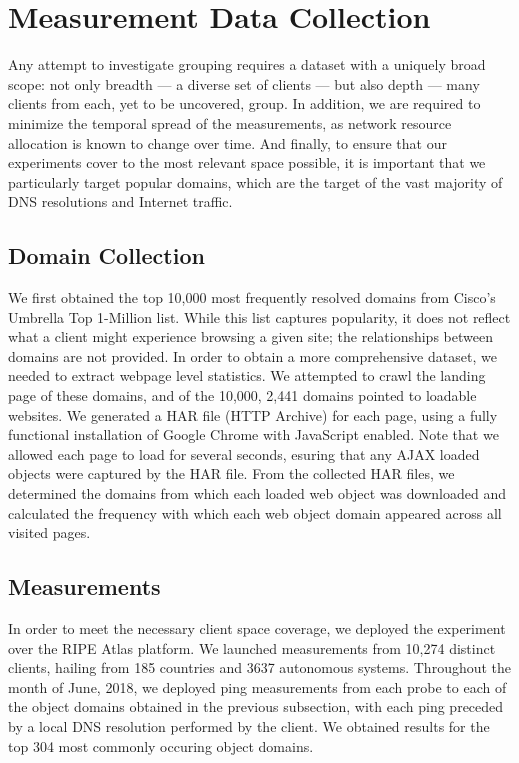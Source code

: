 \section{Measurement Data Collection} \label{sky:data}

Any attempt to investigate grouping requires a dataset with a
uniquely broad scope: not only breadth --- a diverse set of clients --- but also depth --- many
clients from each, yet to be uncovered, group. In addition, we are required to minimize the
temporal spread of the measurements, as network resource allocation is known to change over time.
And finally, to ensure that our experiments cover to the most relevant space possible, it is
important that we particularly target popular domains, which are the target of the vast majority
of DNS resolutions and Internet traffic.

\subsection{Domain Collection}

We first obtained the top 10,000 most frequently resolved domains from Cisco's Umbrella Top
1-Million list. While this list captures popularity, it does not reflect what a client might
experience browsing a given site; the relationships between domains are not provided. In order to
obtain a more comprehensive dataset, we needed to extract webpage level statistics. We attempted to
crawl the landing page of these domains, and of the 10,000, 2,441 domains pointed to loadable
websites. We generated a HAR file (HTTP Archive) for each page, using a fully functional
installation of Google Chrome with JavaScript enabled. Note that we allowed each page to load for
several seconds, esuring that any AJAX loaded objects were captured by the HAR file. From the
collected HAR files, we determined the domains from which each loaded web object was downloaded and
calculated the frequency with which each web object domain appeared across all visited pages. 

\subsection{Measurements}

In order to meet the necessary client space coverage, we deployed the
experiment over the RIPE Atlas platform. We launched measurements from 10,274 distinct clients, hailing
from 185 countries and 3637 autonomous systems. Throughout the month of June, 2018, we deployed ping
measurements from each probe to each of the object domains obtained in the previous subsection, with
each ping preceded by a local DNS resolution performed by the client. We obtained results for the
top 304 most commonly occuring object domains. 

